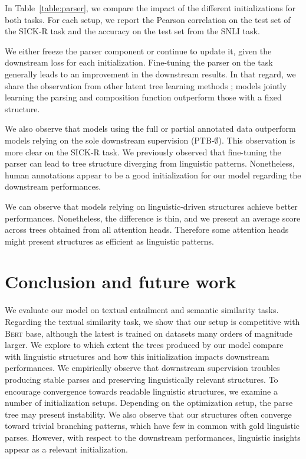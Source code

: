 In Table~\ref{table:parser}, we compare the impact of the different initializations for both tasks. For each setup, we report the Pearson correlation on the test set of the SICK-R task and the accuracy on the test set from the SNLI task.

We either freeze the parser component or continue to update it, given the downstream loss for each initialization. Fine-tuning the parser on the task generally leads to an improvement in the downstream results. In that regard, we share the observation from other latent tree learning methods \parencite{maillard_19, choi_18}; models jointly learning the parsing and composition function outperform those with a fixed structure. 

We also observe that models using the full or partial annotated data outperform models relying on the sole downstream supervision (PTB-$\emptyset$). This observation is more clear on the SICK-R task. We previously observed that fine-tuning the parser can lead to tree structure diverging from linguistic patterns. Nonetheless, human annotations appear to be a good initialization for our model regarding the downstream performances. 

We can observe that models relying on linguistic-driven structures achieve better performances. Nonetheless, the difference is thin, and we present an average score across trees obtained from all attention heads. Therefore some attention heads might present structures as efficient as linguistic patterns.

\section{Conclusion and future work}

We evaluate our model on textual entailment and semantic similarity tasks. Regarding the textual similarity task, we show that our setup is competitive with \textsc{Bert} base, although the latest is trained on datasets many orders of magnitude larger. We explore to which extent the trees produced by our model compare with linguistic structures and how this initialization impacts downstream performances. We empirically observe that downstream supervision troubles producing stable parses and preserving linguistically relevant structures.  %
To encourage convergence towards readable linguistic structures, we examine a number of initialization setups. Depending on the optimization setup, the parse tree may present instability. We also observe that our structures often converge toward trivial branching patterns, which have few in common with gold linguistic parses. However, with respect to the downstream performances, linguistic insights appear as a relevant initialization.